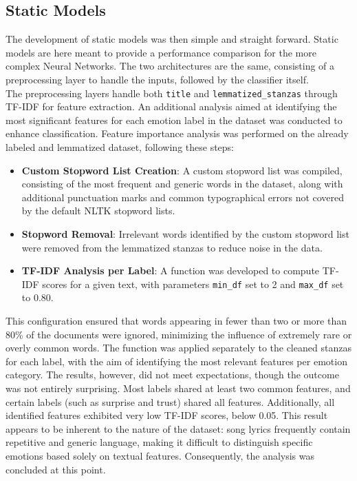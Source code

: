 \subsection*{Static Models}
The development of static models was then simple and straight forward.
Static models are here meant to provide a performance comparison
for the more complex Neural Networks.
The two architectures are the same, consisting of a preprocessing
layer to handle the inputs, followed by the classifier itself.\\

The preprocessing layers handle both \texttt{title} and
\texttt{lemmatized\_stanzas} through TF-IDF for feature extraction.
An additional analysis aimed at identifying the most significant features for
each emotion label in the dataset was conducted to enhance classification.
Feature importance analysis was performed on the already labeled and
lemmatized dataset, following these steps:
\begin{itemize}
    \item \textbf{Custom Stopword List Creation}: A custom stopword list was
    compiled, consisting
    of the most frequent and generic words in the dataset, along with additional
    punctuation marks and common typographical errors not covered by the default
    NLTK stopword lists.

    \item \textbf{Stopword Removal}: Irrelevant words identified by the custom
    stopword list were removed from the lemmatized stanzas to reduce noise in
    the data.

    \item \textbf{TF-IDF Analysis per Label}: A function was developed to
    compute TF-IDF scores for a given text, with parameters \texttt{min\_df}
    set to 2 and \texttt{max\_df} set to 0.80.
\end{itemize}
This configuration ensured that words appearing in fewer than two or
more than 80\% of the documents were ignored, minimizing the influence of
extremely rare or overly common words. The function was applied separately to
the cleaned stanzas for each label, with the aim of identifying the most
relevant features per emotion category.
The results, however, did not meet expectations, though the outcome was not
entirely surprising. Most labels shared at least two common features, and
certain labels (such as surprise and trust) shared all features.
Additionally, all identified features exhibited very low TF-IDF scores,
below 0.05.
This result appears to be inherent to the nature of the dataset: song lyrics
frequently contain repetitive and generic language, making it difficult to
distinguish specific emotions based solely on textual features.
Consequently, the analysis was concluded at this point.\\

